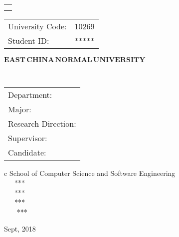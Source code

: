 

\pagestyle{empty}

\begin{flushleft}
	\large
	\renewcommand\arraystretch{1.5}
	\begin{tabular}{l}
		\noindent{\large Dissertation for master degree in 2019}  \\ 
		\noindent{\large  (Professional)}\\ 
	\end{tabular}
\qquad
	\begin{tabular}{lc}
	 University Code:  &  10269  \\ 
 Student ID: &    *****  \\ 
	\end{tabular}
\end{flushleft}

\vskip 2cm

\begin{center}
{\Huge $\mathbf{EAST}\,\mathbf{CHINA}\,\mathbf{NORMAL}\,
\mathbf{UNIVERSITY}$}
\end{center}

\vskip 3cm

\begin{center}
\bfseries{\scshape{\huge \TheisNameEn
}}\\
\end{center}

\vskip 2cm {\large
\begin{center}
\begin{tabular}{l}
Department:\\
Major:\\ 
Research Direction:\\
Supervisor:\\
Candidate:
\end{tabular}
\begin{tabular}c
\small	{{School of Computer Science and Software Engineering}}\\
\hline ~~~{***}  \\
\hline ~~~{***}\\
\hline ~~~{***}\\
\hline ~~~ {***}\\
\hline
\end{tabular}
\end{center}}

\vskip 30mm

\begin{center}
{\Large Sept, 2018}
\end{center}

